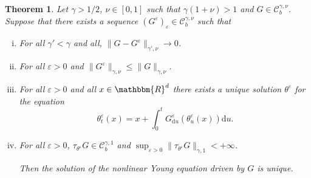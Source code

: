\documentclass[a4paper,11pt]{article}
\newcommand{\mathd}{\mathrm{d}}
\newenvironment{enumerateroman}{\begin{enumerate}[i.] }{\end{enumerate}}
\newtheorem{theorem}{Theorem}[section]
\newcommand{\CC}{\mathscr C}
\begin{document}
\begin{theorem}
  \label{theorem:uniqueness_general_case}Let $\gamma >1/2$, $\nu \in
  [ 0,1 ]$ such that $\gamma ( 1+ \nu ) >1$ and $G \in \CC^{\gamma ,
  \nu}_{b}$. Suppose that there exists a sequence $( G^{\varepsilon}
  )_{\varepsilon} \in \CC^{\gamma , \nu}_{b}$ such that
  \begin{enumerateroman}
    \item For all $\gamma' < \gamma$ and all, $\| G-G^{\varepsilon}
    \|_{\gamma' , \nu} \rightarrow 0$.
    
    \item For all $\varepsilon >0$ and $\| G^{\varepsilon} \|_{\gamma , \nu}
    \leqslant \| G \|_{\gamma , \nu}$.
    
    \item For all $\varepsilon >0$ and all $x \in \mathbbm{R}^{d}$ there
    exists a unique solution $\theta^{\varepsilon}$ for the equation
    \[ \theta^{\varepsilon}_{t} ( x ) =x+ \int_{0}^{t}
       G^{\varepsilon}_{\mathd u} ( \theta^{\varepsilon}_{u} ( x ) ) \mathd u.
    \]
    \item For all $\varepsilon >0$, $\tau_{\theta^{\varepsilon}} G \in
    \CC^{\gamma ,1}_{b}$ and
    $ \sup_{\varepsilon >0} \| \tau_{\theta^{\varepsilon}} G \|_{\gamma ,1}
       <+ \infty $. 

    Then the solution of the nonlinear Young equation driven by $G$ is unique.
  \end{enumerateroman}
\end{theorem}
\end{document}
